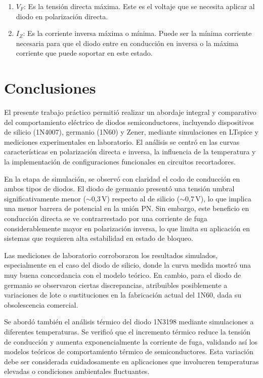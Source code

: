 \documentclass[chaptersright]{informeutn}
\begin{document}
\begin{itemize}
\begin{enumerate}
                    \item $V_F$: Es la tensión directa máxima. Este es el voltaje que se necesita aplicar al diodo en polarización directa.
                    \item $I_Z$: Es la corriente inversa máxima o mínima. Puede ser la mínima corriente necesaria para que el diodo entre en conducción en inversa o la máxima corriente que puede soportar en este estado.
                \end{enumerate}
        \end{itemize}
        
  \chapter{Conclusiones}

El presente trabajo práctico permitió realizar un abordaje integral y comparativo del comportamiento eléctrico de diodos semiconductores, incluyendo dispositivos de silicio (1N4007), germanio (1N60) y Zener, mediante simulaciones en LTspice y mediciones experimentales en laboratorio. El análisis se centró en las curvas características en polarización directa e inversa, la influencia de la temperatura y la implementación de configuraciones funcionales en circuitos recortadores.

En la etapa de simulación, se observó con claridad el codo de conducción en ambos tipos de diodos. El diodo de germanio presentó una tensión umbral significativamente menor ($\sim$0{,}3\,V) respecto al de silicio ($\sim$0{,}7\,V), lo que implica una menor barrera de potencial en la unión PN. Sin embargo, este beneficio en conducción directa se ve contrarrestado por una corriente de fuga considerablemente mayor en polarización inversa, lo que limita su aplicación en sistemas que requieren alta estabilidad en estado de bloqueo.

Las mediciones de laboratorio corroboraron los resultados simulados, especialmente en el caso del diodo de silicio, donde la curva medida mostró una muy buena concordancia con el modelo teórico. En cambio, para el diodo de germanio se observaron ciertas discrepancias, atribuibles posiblemente a variaciones de lote o sustituciones en la fabricación actual del 1N60, dada su obsolescencia comercial.

Se abordó también el análisis térmico del diodo 1N3198 mediante simulaciones a diferentes temperaturas. Se verificó que el incremento térmico reduce la tensión de conducción y aumenta exponencialmente la corriente de fuga, validando así los modelos teóricos de comportamiento térmico de semiconductores. Esta variación debe ser considerada cuidadosamente en aplicaciones que involucren temperaturas elevadas o condiciones ambientales fluctuantes.
\end{document}
